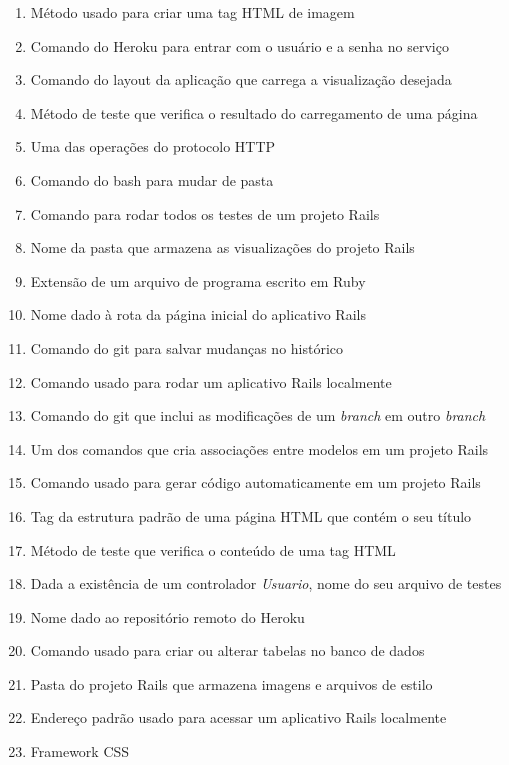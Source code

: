 \documentclass[a4paper,10pt]{article}
\begin{document}
\begin{minipage}[c]{0.7\linewidth}
\begin{enumerate}[label=(\PaddingUp*),itemsep=.1em]
    \item Método usado para criar uma tag HTML de imagem
    \item Comando do Heroku para entrar com o usuário e a senha no serviço
    \item Comando do layout da aplicação que carrega a visualização desejada
    \item Método de teste que verifica o resultado do carregamento de uma página
    \item Uma das operações do protocolo HTTP
    \item Comando do bash para mudar de pasta
    \item Comando para rodar todos os testes de um projeto Rails
    \item Nome da pasta que armazena as visualizações do projeto Rails
    \item Extensão de um arquivo de programa escrito em Ruby
    \item Nome dado à rota da página inicial do aplicativo Rails
    \item Comando do git para salvar mudanças no histórico
    \item Comando usado para rodar um aplicativo Rails localmente
    \item Comando do git que inclui as modificações de um \textit{branch} em outro \textit{branch}
    \item Um dos comandos que cria associações entre modelos em um projeto Rails
    \item Comando usado para gerar código automaticamente em um projeto Rails
    \item Tag da estrutura padrão de uma página HTML que contém o seu título
    \item Método de teste que verifica o conteúdo de uma tag HTML
    \item Dada a existência de um controlador \textit{Usuario}, nome do seu arquivo de testes
    \item Nome dado ao repositório remoto do Heroku
    \item Comando usado para criar ou alterar tabelas no banco de dados
    \item Pasta do projeto Rails que armazena imagens e arquivos de estilo
    \item Endereço padrão usado para acessar um aplicativo Rails localmente
    \item Framework CSS
  \end{enumerate}
\end{minipage} %
\end{document}
